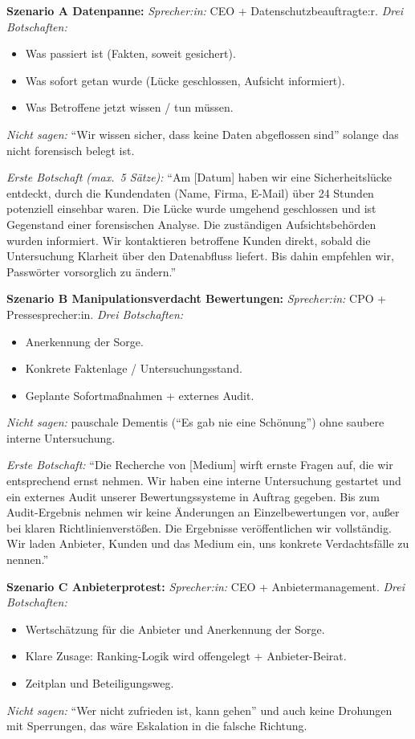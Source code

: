 \documentclass[11pt,a4paper,oneside]{article}
\begin{document}
\begin{loesungbox}
\textbf{Szenario A \textendash{} Datenpanne:}
\emph{Sprecher:in:} CEO + Datenschutzbeauftragte:r. \emph{Drei Botschaften:}
\begin{itemize}
  \item Was passiert ist (Fakten, soweit gesichert).
  \item Was sofort getan wurde (Lücke geschlossen, Aufsicht informiert).
  \item Was Betroffene jetzt wissen / tun müssen.
\end{itemize}
\emph{Nicht sagen:} ``Wir wissen sicher, dass keine Daten abgeflossen sind'' \textendash{} solange das nicht forensisch belegt ist.

\smallskip
\emph{Erste Botschaft (max.\ 5 Sätze):} ``Am [Datum] haben wir eine Sicherheitslücke entdeckt, durch die Kundendaten (Name, Firma, E-Mail) über 24 Stunden potenziell einsehbar waren. Die Lücke wurde umgehend geschlossen und ist Gegenstand einer forensischen Analyse. Die zuständigen Aufsichtsbehörden wurden informiert. Wir kontaktieren betroffene Kunden direkt, sobald die Untersuchung Klarheit über den Datenabfluss liefert. Bis dahin empfehlen wir, Passwörter vorsorglich zu ändern.''

\smallskip
\textbf{Szenario B \textendash{} Manipulationsverdacht Bewertungen:}
\emph{Sprecher:in:} CPO + Pressesprecher:in. \emph{Drei Botschaften:}
\begin{itemize}
  \item Anerkennung der Sorge.
  \item Konkrete Faktenlage / Untersuchungsstand.
  \item Geplante Sofortmaßnahmen + externes Audit.
\end{itemize}
\emph{Nicht sagen:} pauschale Dementis (``Es gab nie eine Schönung'') ohne saubere interne Untersuchung.

\smallskip
\emph{Erste Botschaft:} ``Die Recherche von [Medium] wirft ernste Fragen auf, die wir entsprechend ernst nehmen. Wir haben eine interne Untersuchung gestartet und ein externes Audit unserer Bewertungssysteme in Auftrag gegeben. Bis zum Audit-Ergebnis nehmen wir keine Änderungen an Einzelbewertungen vor, außer bei klaren Richtlinienverstößen. Die Ergebnisse veröffentlichen wir vollständig. Wir laden Anbieter, Kunden und das Medium ein, uns konkrete Verdachtsfälle zu nennen.''

\smallskip
\textbf{Szenario C \textendash{} Anbieterprotest:}
\emph{Sprecher:in:} CEO + Anbietermanagement. \emph{Drei Botschaften:}
\begin{itemize}
  \item Wertschätzung für die Anbieter und Anerkennung der Sorge.
  \item Klare Zusage: Ranking-Logik wird offengelegt + Anbieter-Beirat.
  \item Zeitplan und Beteiligungsweg.
\end{itemize}
\emph{Nicht sagen:} ``Wer nicht zufrieden ist, kann gehen'' \textendash{} und auch keine Drohungen mit Sperrungen, das wäre Eskalation in die falsche Richtung.


\end{loesungbox}
\end{document}
